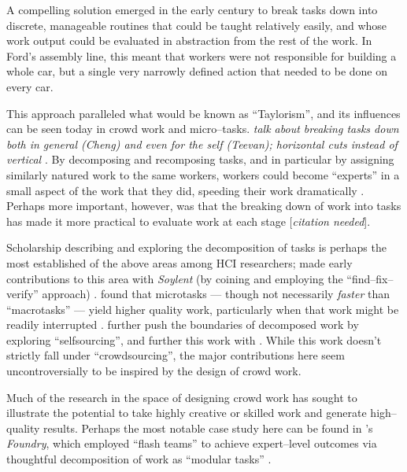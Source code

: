 \documentclass{sigchi}
\begin{document}
A compelling solution emerged in the early  century to break tasks down into discrete,
manageable routines that could be taught relatively easily,
and whose work output could be evaluated in abstraction from the rest of the work.
In Ford's assembly line, this meant that workers were not responsible for building a whole car,
but a single very narrowly defined action that needed to be done on every car.

This approach paralleled what would be known as ``Taylorism'',
and its influences can be seen today in crowd work and micro--tasks.
\textit{talk about breaking tasks down both in general (Cheng) and even for the self (Teevan);
horizontal cuts instead of vertical}
\cite{cheng2015break,writingMicroTasks}.
By decomposing and recomposing tasks,
and in particular by assigning similarly natured work to the same workers,
workers could become ``experts'' in a small aspect of the work that they did,
speeding their work dramatically
\cite{delayAndOrderLasecki}.
Perhaps more important, however, was that
the breaking down of work into tasks has made it more practical to evaluate work at each stage
[\textit{citation needed}].

Scholarship describing and exploring
the decomposition of tasks is perhaps the most established of the above areas among HCI researchers;
\citeauthor{bernsteinSoylent} made early contributions to this area with \textit{Soylent}
(by coining and employing the ``find--fix--verify'' approach)
\cite{bernsteinSoylent}.
\citeauthor{cheng2015break} found that microtasks
--- though not necessarily \textit{faster} than ``macrotasks'' ---
yield higher quality work,
particularly when that work might be readily interrupted
\cite{cheng2015break}.
\citeauthor{selfsourcingTeevan2014} further push the boundaries of decomposed work
by exploring ``selfsourcing'', and further this work with \citeauthor{selfsourcingTeevan2016}
\cite{selfsourcingTeevan2014,selfsourcingTeevan2016}.
While this work doesn't strictly fall under ``crowdsourcing'',
the major contributions here
seem uncontroversially to be inspired by the design of crowd work.

Much of the research in the space of designing crowd work has
sought to illustrate the potential to take highly creative or skilled work
and generate high--quality results.
Perhaps the most notable case study here can be found in
\citeauthor{foundry}'s \textit{Foundry}, which employed
``flash teams'' to achieve expert--level outcomes via thoughtful
decomposition of work as ``modular tasks''
\cite{foundry}.
\end{document}
